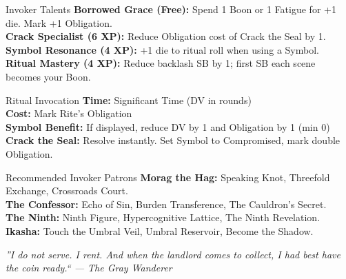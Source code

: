 \documentclass[10pt]{article}
\begin{document}
\begin{minipage}[t]{0.48\linewidth}
    \begin{charbox}{Invoker Talents}
        \textbf{Borrowed Grace (Free):} Spend 1 Boon or 1 Fatigue for +1 die. Mark +1 Obligation.\\
        \textbf{Crack Specialist (6 XP):} Reduce Obligation cost of Crack the Seal by 1.\\
        \textbf{Symbol Resonance (4 XP):} +1 die to ritual roll when using a Symbol.\\
        \textbf{Ritual Mastery (4 XP):} Reduce backlash SB by 1; first SB each scene becomes your Boon.
    \end{charbox}
    
    \vspace{0.5em}
    
    \begin{charbox}{Ritual Invocation}
        \textbf{Time:} Significant Time (DV in rounds)\\
        \textbf{Cost:} Mark Rite's Obligation\\
        \textbf{Symbol Benefit:} If displayed, reduce DV by 1 and Obligation by 1 (min 0)\\
        \textbf{Crack the Seal:} Resolve instantly. Set Symbol to Compromised, mark double Obligation.
    \end{charbox}
    
    \vspace{0.5em}
    
    \begin{charbox}{Recommended Invoker Patrons}
        \textbf{Morag the Hag:} Speaking Knot, Threefold Exchange, Crossroads Court.\\
        \textbf{The Confessor:} Echo of Sin, Burden Transference, The Cauldron's Secret.\\
        \textbf{The Ninth:} Ninth Figure, Hypercognitive Lattice, The Ninth Revelation.\\
        \textbf{Ikasha:} Touch the Umbral Veil, Umbral Reservoir, Become the Shadow.
    \end{charbox}
\end{minipage}

\vspace{0.5em}
\begin{center}
    {\small\sffamily\itshape ''I do not serve. I rent. And when the landlord comes to collect, I had best have the coin ready.`` --- The Gray Wanderer}
\end{center}
\end{document}
